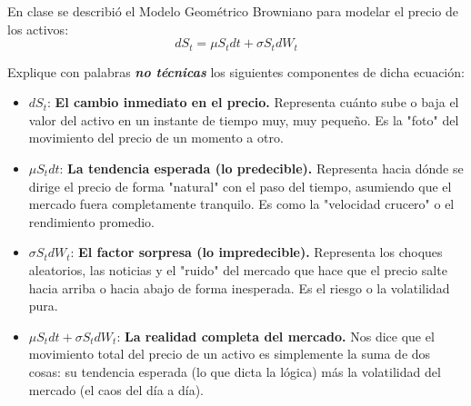 

\noindent \textcolor{azulp}En clase se describió el Modelo Geométrico Browniano para modelar el precio de los activos:
\[
dS_t = \mu S_t dt + \sigma S_t dW_t
\]

\noindent Explique con palabras \textbf{\textit{no técnicas}} los siguientes componentes de dicha ecuación:

\vspace{0.3cm}
\begin{itemize}[label=\textcolor{azulp}{$\circ$}, itemsep=0.4cm, leftmargin=1.5cm]
    \item $dS_t$: \textbf{El cambio inmediato en el precio.} Representa cuánto sube o baja el valor del activo en un instante de tiempo muy, muy pequeño. Es la "foto" del movimiento del precio de un momento a otro.
    
    \item $\mu S_t dt$: \textbf{La tendencia esperada (lo predecible).} Representa hacia dónde se dirige el precio de forma "natural" con el paso del tiempo, asumiendo que el mercado fuera completamente tranquilo. Es como la "velocidad crucero" o el rendimiento promedio.
    
    \item $\sigma S_t dW_t$: \textbf{El factor sorpresa (lo impredecible).} Representa los choques aleatorios, las noticias y el "ruido" del mercado que hace que el precio salte hacia arriba o hacia abajo de forma inesperada. Es el riesgo o la volatilidad pura.
    
    \item $\mu S_t dt + \sigma S_t dW_t$: \textbf{La realidad completa del mercado.} Nos dice que el movimiento total del precio de un activo es simplemente la suma de dos cosas: su tendencia esperada (lo que dicta la lógica) más la volatilidad del mercado (el caos del día a día).
\end{itemize}

